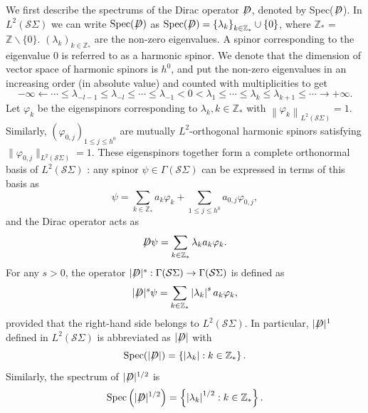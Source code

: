 \documentclass[a4paper, 12pt]{article}
\def\slashiii#1{\setbox0=\hbox{$#1$}#1\hskip-\wd0\hbox to\wd0{\hss\sl/\/\hss}}
\begin{document}
We first describe the spectrums of the Dirac operator $\slashiii{D}$, denoted by Spec($\slashiii{D}$).
In $L^2({\mathcal{S}\Sigma })$ we can write $\operatorname{Spec}(\slashiii{D})$ as $\operatorname{Spec} (\slashiii{D}) = {\left\{ {{\lambda _k}} \right\}_{k \in {\mathbb{Z}_*}}} \cup \left\lbrace 0\right\rbrace $, where $\mathbb{Z}_*$ = $\mathbb{Z} \backslash\{0\}$.  ${\left( {{\lambda _k}} \right)_{k \in {\mathbb{Z}_*}}}$ are the non-zero eigenvalues. A spinor corresponding to the eigenvalue 0 is referred to as a harmonic spinor.
We denote that the dimension of vector space of harmonic spinors is $h^ 0 $, and put the non-zero eigenvalues in an increasing order (in absolute value) and counted with multiplicities to get
$$
-\infty \leftarrow \cdots \leq \lambda_{-l-1} \leq \lambda_{-l} \leq \cdots \leq \lambda_{-1} < 0 < \lambda_1 \leq \cdots \leq \lambda_k \leq \lambda_{k+1} \leq \cdots \rightarrow+\infty .
$$
Let $\varphi_k$ be the eigenspinors corresponding to $\lambda_k, k \in \mathbb{Z}_*$ with $\left\|\varphi_k\right\|_{L^2(\mathcal{S}\Sigma)}=1$. Similarly, \((\varphi_{0,j})_{1 \le j \le h^0}\) are mutually \(L^2\)-orthogonal harmonic spinors satisfying \(\|\varphi_{0,j}\|_{L^2(\mathcal{S}\Sigma)} = 1\). These eigenspinors together form a complete orthonormal basis of $L^2(\mathcal{S}\Sigma)$ : any spinor $\psi \in \Gamma(\mathcal{S}\Sigma)$ can be expressed in terms of this basis as
$$
\psi=\sum_{k \in \mathbb{Z}_*} a_k \varphi_k+\sum_{1 \leq j \leq h^0} a_{0, j} \varphi_{0, j},
$$
and the Dirac operator acts as
$$
\slashiii{D} \psi=\sum_{k \in \mathbb{Z}_*} \lambda_k a_k \varphi_k.
$$
For any $s>0$, the operator $|\slashiii{D}|^s: \Gamma(\mathcal{S}\Sigma) \rightarrow \Gamma(\mathcal{S}\Sigma)$ is defined as
$$
|\slashiii{D}|^s \psi=\sum_{k \in \mathbb{Z}_*}\left|\lambda_k\right|^s a_k \varphi_k,
$$
provided that the right-hand side belongs to $L^2(\mathcal{S}\Sigma)$. In particular, $|\slashiii{D}|^1$ defined in $L^2(\mathcal{S}\Sigma)$ is abbreviated as $|\slashiii{D}|$ with
$$
\operatorname{Spec}(|\slashiii{D}|)=\left\{\left|\lambda_k \right| : k \in \mathbb{Z}_*\right\}.
$$
Similarly,  the spectrum of $|\slashiii{D}|^{1 / 2}$ is
$$
\operatorname{Spec}\left(|\slashiii{D}|^{1 / 2}\right)=\left\{\left|\lambda_k \right|^{1 / 2} : k \in \mathbb{Z}_*\right\}.%
$$
\end{document}
